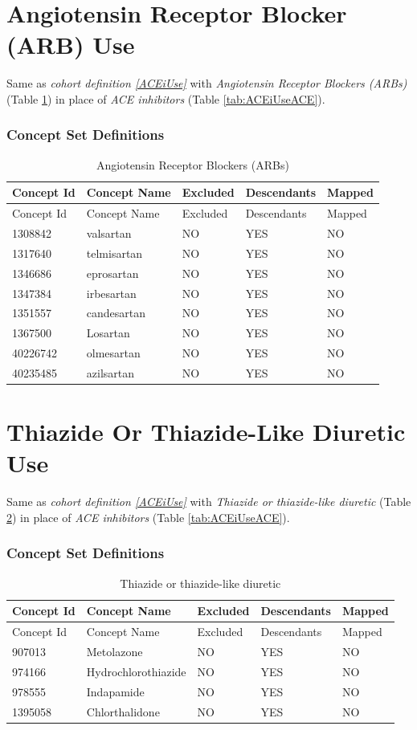 \documentclass[11pt]{book}
\theoremstyle{definition}
\theoremstyle{definition}
\theoremstyle{definition}
\theoremstyle{remark}
\begin{document}
\section{Angiotensin Receptor Blocker (ARB) Use}\label{ARBUse}

Same as \emph{cohort definition \ref{ACEiUse}} with \emph{Angiotensin
Receptor Blockers (ARBs)} (Table \ref{tab:ARBUseARBs}) in place of
\emph{ACE inhibitors} (Table \ref{tab:ACEiUseACE}).

\subsubsection*{Concept Set
Definitions}\label{concept-set-definitions-7}

\begin{longtable}[]{@{}lllll@{}}
\caption{\label{tab:ARBUseARBs} Angiotensin Receptor Blockers
(ARBs)}\tabularnewline
\toprule
Concept Id & Concept Name & Excluded & Descendants &
Mapped\tabularnewline
\midrule
\endfirsthead
\toprule
Concept Id & Concept Name & Excluded & Descendants &
Mapped\tabularnewline
\midrule
\endhead
1308842 & valsartan & NO & YES & NO\tabularnewline
1317640 & telmisartan & NO & YES & NO\tabularnewline
1346686 & eprosartan & NO & YES & NO\tabularnewline
1347384 & irbesartan & NO & YES & NO\tabularnewline
1351557 & candesartan & NO & YES & NO\tabularnewline
1367500 & Losartan & NO & YES & NO\tabularnewline
40226742 & olmesartan & NO & YES & NO\tabularnewline
40235485 & azilsartan & NO & YES & NO\tabularnewline
\bottomrule
\end{longtable}

\section{Thiazide Or Thiazide-Like Diuretic Use}\label{THZUse}

Same as \emph{cohort definition \ref{ACEiUse}} with \emph{Thiazide or
thiazide-like diuretic} (Table \ref{tab:THZUseTHZ}) in place of
\emph{ACE inhibitors} (Table \ref{tab:ACEiUseACE}).

\subsubsection*{Concept Set
Definitions}\label{concept-set-definitions-8}

\begin{longtable}[]{@{}lllll@{}}
\caption{\label{tab:THZUseTHZ} Thiazide or thiazide-like
diuretic}\tabularnewline
\toprule
Concept Id & Concept Name & Excluded & Descendants &
Mapped\tabularnewline
\midrule
\endfirsthead
\toprule
Concept Id & Concept Name & Excluded & Descendants &
Mapped\tabularnewline
\midrule
\endhead
907013 & Metolazone & NO & YES & NO\tabularnewline
974166 & Hydrochlorothiazide & NO & YES & NO\tabularnewline
978555 & Indapamide & NO & YES & NO\tabularnewline
1395058 & Chlorthalidone & NO & YES & NO\tabularnewline
\bottomrule
\end{longtable}
\end{document}
